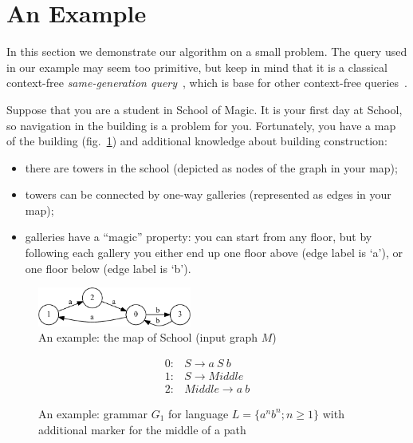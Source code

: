 \section{An Example}\label{motivExample}

In this section we demonstrate our algorithm on a small problem.
The query used in our example may seem too primitive, but keep in mind that it is a classical context-free \textit{same-generation query}~\cite{FndDB}, which is base for other context-free queries~\cite{GraphQueryWithEarley}.

Suppose that you are a student in School of Magic.
It is your first day at School, so navigation in the building is a problem for you.
Fortunately, you have a map of the building (fig.~\ref{input}) and additional knowledge about building construction:
\begin{itemize}
  \item there are towers in the school (depicted as nodes of the graph in your map);
  \item towers can be connected by one-way galleries (represented as edges in your map);
  \item galleries have a ``magic'' property: you can start from any floor, but by following each gallery you either end up one floor above (edge label is `a'), or one floor below (edge label is `b'). 
\end{itemize}

\begin{figure}[ht]
    \centering
        \includegraphics[width=0.45\textwidth]{dot/input.pdf}
        \caption{An example: the map of School (input graph $M$)}
        \label{input}        
\end{figure}
 
\begin{figure}[ht]
\centering
   \[
\begin{array}{rl} 
   0:& S \rightarrow a \ S \ b \\
   1:& S \rightarrow Middle \\
   2:& Middle \rightarrow a \ b
\end{array}
\]
   \caption{An example: grammar $G_1$ for language $L=\{a^n b^n; n \geq 1\}$ with additional marker for the middle of a path}
   \label{grammarG}        
    \end{figure}


